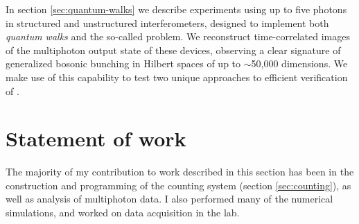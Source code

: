 In section \ref{sec:quantum-walks} we describe experiments using up to five photons in structured and unstructured interferometers, designed to implement both \emph{quantum walks} and the so-called \bosonsampling problem. We reconstruct time-correlated images of the multiphoton output state of these devices, observing a clear signature of generalized bosonic bunching in Hilbert spaces of up to $\sim$50,000 dimensions. We make use of this capability to test two unique approaches to efficient verification of \bosonsampling.



\section*{Statement of work}
The majority of my contribution to work described in this section has been in the construction and programming of the counting system (section \ref{sec:counting}), as well as analysis of multiphoton data. I also performed many of the numerical simulations, and worked on data acquisition in the lab.



